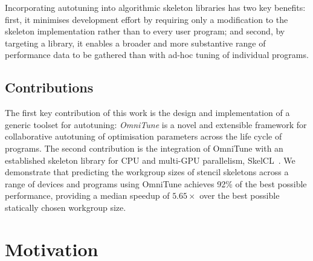 \documentclass[nonatbib,preprint,9pt]{sigplanconf}
\begin{document}
Incorporating autotuning into algorithmic skeleton libraries has two
key benefits: first, it minimises development effort by requiring only
a modification to the skeleton implementation rather than to every
user program; and second, by targeting a library, it enables a broader
and more substantive range of performance data to be gathered than
with ad-hoc tuning of individual programs.



\subsection{Contributions}

The first key contribution of this work is the design and
implementation of a generic toolset for autotuning: \emph{OmniTune} is
a novel and extensible framework for collaborative autotuning of
optimisation parameters across the life cycle of programs. The second
contribution is the integration of OmniTune with an established
skeleton library for CPU and multi-GPU parallelism,
SkelCL~\cite{Steuwer2011}. We demonstrate that predicting the
workgroup sizes of stencil skeletons across a range of devices and
programs using OmniTune achieves 92\% of the best possible
performance, providing a median speedup of $5.65\times$ over the best
possible statically chosen workgroup size.


\section{Motivation}
\end{document}
